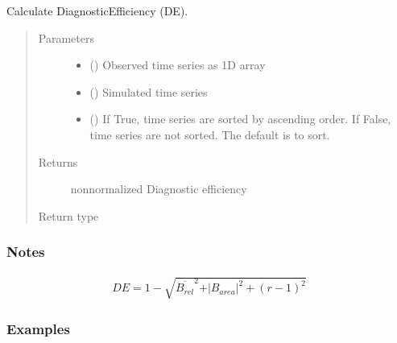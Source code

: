 \documentclass[letterpaper,10pt,english]{sphinxmanual}
\begin{document}
\begin{fulllineitems}
\label{\detokenize{reference/de:de.de.calc_de}}
Calculate Diagnostic\sphinxhyphen{}Efficiency (DE).
\begin{quote}\begin{description}
\item[{Parameters}] \leavevmode\begin{itemize}
\item {} 
 (\sphinxstyleliteralemphasis{\sphinxupquote{(}}\sphinxstyleliteralemphasis{\sphinxupquote{,}}\sphinxstyleliteralemphasis{\sphinxupquote{)}}) \textendash{} Observed time series as 1\sphinxhyphen{}D array

\item {} 
 (\sphinxstyleliteralemphasis{\sphinxupquote{(}}\sphinxstyleliteralemphasis{\sphinxupquote{,}}\sphinxstyleliteralemphasis{\sphinxupquote{)}}) \textendash{} Simulated time series

\item {} 
 (\sphinxstyleliteralemphasis{\sphinxupquote{, }}) \textendash{} If True, time series are sorted by ascending order. If False, time
series are not sorted. The default is to sort.

\end{itemize}

\item[{Returns}] \leavevmode
{} \textendash{} non\sphinxhyphen{}normalized Diagnostic efficiency

\item[{Return type}] \leavevmode
{}

\end{description}\end{quote}
\subsubsection*{Notes}
\begin{equation*}
\begin{split}DE = 1 - \sqrt{\overline{B_{rel}}^2 + \vert B_{area}\vert^2 + (r - 1)^2}\end{split}
\end{equation*}\subsubsection*{Examples}


\end{fulllineitems}
\end{document}
